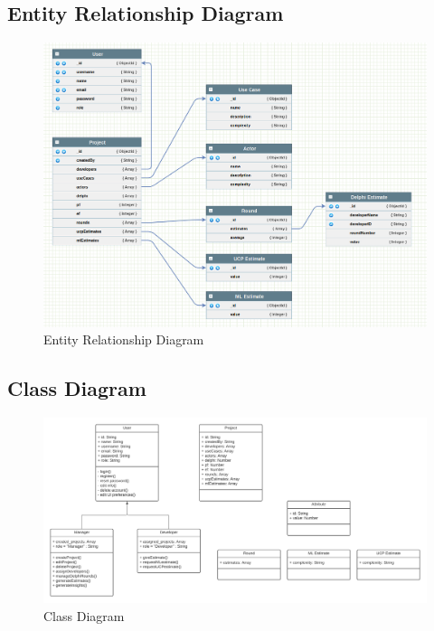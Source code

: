 \subsection{Entity Relationship Diagram}
\begin{figure}[H]
    \centering
    \includegraphics[scale=0.4]{./diagrams/ERD.png}
    \caption{Entity Relationship Diagram}
    \label{fig:er-diag}

\end{figure}







\subsection{Class Diagram}
\begin{figure}[H]
    \centering
    \includegraphics[scale=0.5]{./diagrams/class-diagram.png}
    \caption{Class Diagram}
    \label{fig:class-diag}
\end{figure}


